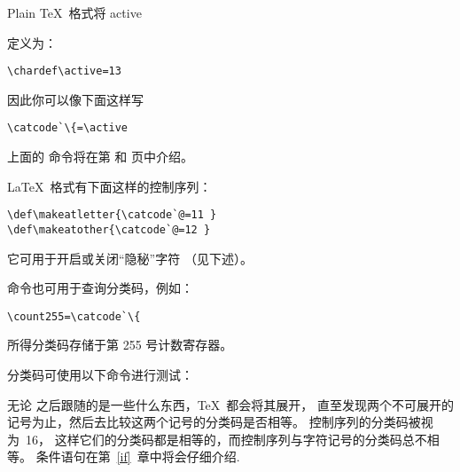 \documentclass{book}
\begin{document}
Plain \TeX\ 格式将 \csterm active\par 定义为：
\begin{verbatim}
\chardef\active=13
\end{verbatim}
因此你可以像下面这样写
\begin{verbatim}
\catcode`\{=\active
\end{verbatim}
上面的  命令将在第 \pageref{chardef} 和 \pageref{num:chardef} 页中介绍。

\LaTeX\ 格式有下面这样的控制序列：
\begin{verbatim}
\def\makeatletter{\catcode`@=11 }
\def\makeatother{\catcode`@=12 }
\end{verbatim}
它可用于开启或关闭“隐秘”字符 \n@（见下述）。

 命令也可用于查询分类码，例如：
\begin{verbatim}
\count255=\catcode`\{
\end{verbatim}
所得分类码存储于第 255 号计数寄存器。

分类码可使用以下命令进行测试：
\begin{disp}\end{disp}
无论  之后跟随的是一些什么东西，\TeX\ 都会将其展开，
直至发现两个不可展开的记号为止，然后去比较这两个记号的分类码是否相等。
控制序列的分类码被视为~16，
这样它们的分类码都是相等的，而控制序列与字符记号的分类码总不相等。
条件语句在第~\ref{if}~章中将会仔细介绍.
\end{document}
